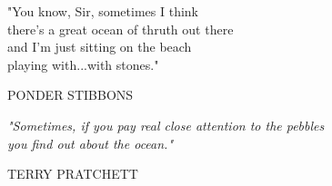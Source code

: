 

\clearpage

\pagestyle{empty}
\null\vfill

\settowidth{}
\parbox{\longest}{%
  \raggedright{\large\itshape%
  
  \hspace{1cm}"You know, Sir, sometimes I think\\ 
  \hspace{1cm}there's a great ocean of thruth out there\\
  \hspace{1cm}and I'm just sitting on the beach\\
  \hspace{1cm}playing with...with stones."\\
  \par\bigskip
  }
  \hspace{8cm} \large\MakeUppercase{Ponder Stibbons}\par%
  \vspace{2cm}
  
  \raggedright{\large\itshape%
  \hspace{1cm}"Sometimes, if you pay real close attention to the pebbles \\ 
  \hspace{1cm}you find out about the ocean."\\ 
  \par\bigskip
  }   
  \vspace{1cm}
  \hspace{8cm} \large\MakeUppercase{Terry Pratchett}\par%
}

\vfill\vfill
\clearpage

